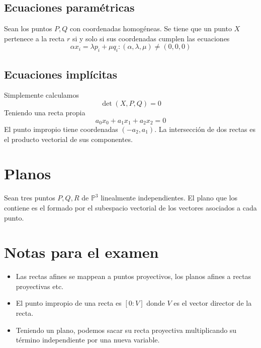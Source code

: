 \documentclass{Geometria.tex}
\begin{document}
\subsection{Ecuaciones paramétricas}
Sean los puntos $P,Q$ con coordenadas homogéneas. Se tiene que un punto $X$
pertenece a la recta $r$ si y solo si sus coordenadas cumplen las ecuaciones
\[
	\alpha x_{i} = \lambda p_{i} + \mu q_{i} : (\alpha, \lambda, \mu)
	\neq (0,0,0)
\]
\subsection{Ecuaciones implícitas}
Simplemente calculamos
\[
	\det (X, P, Q) = 0
\]
Teniendo una recta propia
\[
	a_{0}x_{0} + a_{1}x_{1} + a_{2}x_{2} = 0
\]
El punto impropio tiene coordenadas $(-a_{2}, a_{1})$. La intersección de dos rectas es el producto vectorial de sus componentes. 
\section{Planos}
Sean tres puntos $P,Q,R$ de $\mathbb{P} ^{3}$ linealmente independientes. El plano que los contiene es el formado por el subespacio vectorial de los vectores asociados a cada punto.  
\section{Notas para el examen}
\begin{itemize}
  \item Las rectas afines se mappean a puntos proyectivos,
    los planos afines a rectas proyectivas etc.
  \item El punto impropio de una recta es $[0: V]$ donde $V$
    es el vector director de la recta.
  \item Teniendo un plano, podemos sacar su recta proyectiva
    multiplicando su término independiente por una nueva variable.
\end{itemize}
\end{document}
